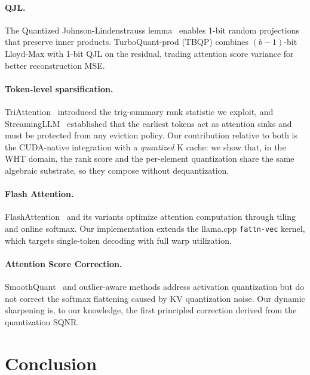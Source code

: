 \documentclass[10pt,twocolumn]{article}
\begin{document}
\paragraph{QJL.} The Quantized Johnson-Lindenstrauss lemma~\cite{qjl2024} enables 1-bit random projections that preserve inner products. TurboQuant-prod (TBQP) combines $(b{-}1)$-bit Lloyd-Max with 1-bit QJL on the residual, trading attention score variance for better reconstruction MSE.

\paragraph{Token-level sparsification.} TriAttention~\cite{triattention2026} introduced the trig-summary rank statistic we exploit, and StreamingLLM~\cite{streamingllm2023} established that the earliest tokens act as attention sinks and must be protected from any eviction policy. Our contribution relative to both is the CUDA-native integration with a \emph{quantized} K cache: we show that, in the WHT domain, the rank score and the per-element quantization share the same algebraic substrate, so they compose without dequantization.

\paragraph{Flash Attention.} FlashAttention~\cite{dao2022flashattention,dao2023flashattention2} and its variants optimize attention computation through tiling and online softmax. Our implementation extends the llama.cpp \texttt{fattn-vec} kernel, which targets single-token decoding with full warp utilization.

\paragraph{Attention Score Correction.} SmoothQuant~\cite{smoothquant2023} and outlier-aware methods address activation quantization but do not correct the softmax flattening caused by KV quantization noise. Our dynamic sharpening is, to our knowledge, the first principled correction derived from the quantization SQNR.

\section{Conclusion}
\label{sec:conclusion}
\end{document}
